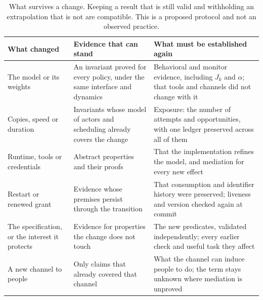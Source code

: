 \documentclass[10pt,twocolumn]{article}
\theoremstyle{plain}
\theoremstyle{definition}
\begin{document}
\begin{table}[t]
\centering
\footnotesize
\setlength{\tabcolsep}{5pt}
\renewcommand{\arraystretch}{1.16}
\begin{tabularx}{\textwidth}{@{}P{1.35in}LL@{}}
\toprule
\textbf{What changed} & \textbf{Evidence that can stand} & \textbf{What must be established again}\\
\midrule
The model or its weights & An invariant proved for every policy, under the same interface and dynamics & Behavioral and monitor evidence, including $J_{k}$ and $\alpha$; that tools and channels did not change with it\\
Copies, speed or duration & Invariants whose model of actors and scheduling already covers the change & Exposure: the number of attempts and opportunities, with one ledger preserved across all of them\\
Runtime, tools or credentials & Abstract properties and their proofs & That the implementation refines the model, and mediation for every new effect\\
Restart or renewed grant & Evidence whose premises persist through the transition & That consumption and identifier history were preserved; liveness and version checked again at commit\\
The specification, or the interest it protects & Evidence for properties the change does not touch & The new predicates, validated independently; every earlier check and useful task they affect\\
A new channel to people & Only claims that already covered that channel & What the channel can induce people to do; the term stays unknown where mediation is unproved\\
\bottomrule
\end{tabularx}
\caption{What survives a change. Keeping a result that is still valid and withholding an
extrapolation that is not are compatible. This is a proposed protocol and not an observed
practice.}
\label{tab:renewal}
\end{table}
\end{document}
